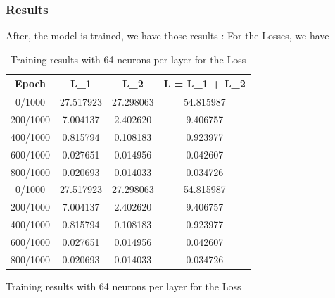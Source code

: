 \documentclass{report}
\begin{document}
        \subsubsection{Results}
            After, the model is trained, we have those results :
            For the Losses, we have 
            \begin{table}[h]
                \centering
                \begin{tabular}{|c|c|c|c|}
                \hline
                Epoch & L_{1} & L_{2} & L = L_{1} + L_{2} \\
                \hline
                0/1000 & 27.517923 & 27.298063 & 54.815987 \\
                200/1000 & 7.004137 & 2.402620 & 9.406757 \\
                400/1000 & 0.815794 & 0.108183 & 0.923977 \\
                600/1000 & 0.027651 & 0.014956 & 0.042607 \\
                800/1000 & 0.020693 & 0.014033 & 0.034726 \\
                0/1000 & 27.517923 & 27.298063 & 54.815987 \\
                200/1000 & 7.004137 & 2.402620 & 9.406757 \\
                400/1000 & 0.815794 & 0.108183 & 0.923977 \\
                600/1000 & 0.027651 & 0.014956 & 0.042607 \\
                800/1000 & 0.020693 & 0.014033 & 0.034726 \\
                \hline
                \end{tabular}
                \caption{Training results with 64 neurons per layer for the Loss}

                \caption{Training results with 64 neurons per layer for the Loss}

            \end{table}
\end{document}
